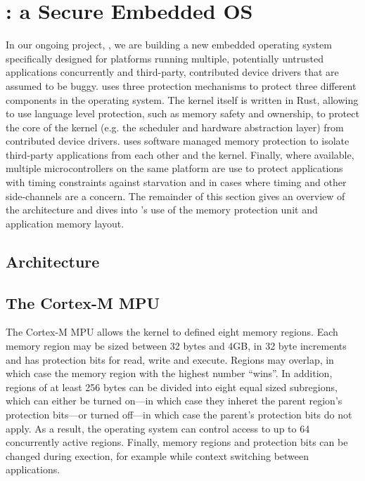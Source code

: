 \section{\name: a Secure Embedded OS}

In our ongoing project, \name, we are building a new embedded operating system
specifically designed for platforms running multiple, potentially untrusted
applications concurrently and third-party, contributed device drivers that are
assumed to be buggy. \name uses three protection mechanisms to protect three
different components in the operating system. The kernel itself is written in
Rust, allowing \name to use language level protection, such as memory safety and
ownership, to protect the core of the kernel (e.g. the scheduler and hardware
abstraction layer) from contributed device drivers. \name uses software managed
memory protection to isolate third-party applications from each other and the
kernel. Finally, where available, multiple microcontrollers on the same platform
are use to protect applications with timing constraints against starvation and
in cases where timing and other side-channels are a concern. The remainder of
this section gives an overview of the \name architecture and dives into \name's
use of the memory protection unit and application memory layout.

\subsection{Architecture}

\subsection{The Cortex-M MPU}

The Cortex-M MPU allows the kernel to defined eight memory regions. Each memory
region may be sized between 32 bytes and 4GB, in 32 byte increments and has
protection bits for read, write and execute. Regions may overlap, in which case
the memory region with the highest number ``wins''. In addition, regions of at
least 256 bytes can be divided into eight equal sized subregions, which can
either be turned on---in which case they inheret the parent region's protection
bits---or turned off---in which case the parent's protection bits do not apply.
As a result, the operating system can control access to up to 64 concurrently
active regions. Finally, memory regions and protection bits can be changed
during exection, for example while context switching between applications.

